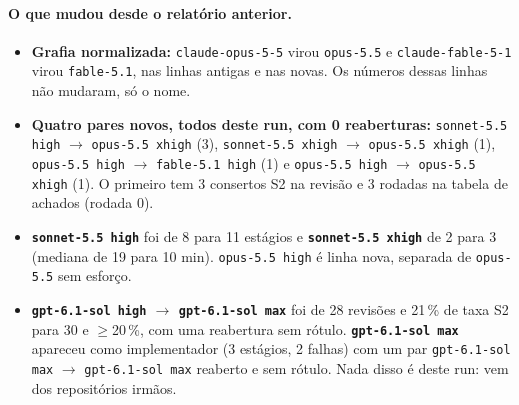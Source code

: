 \documentclass[11pt,a4paper]{article}
\begin{document}
\medskip
{}

\paragraph{O que mudou desde o relatório anterior.}
\begin{itemize}
  \item \textbf{Grafia normalizada:} \texttt{claude-opus-5-5} virou
        \texttt{opus-5.5} e \texttt{claude-fable-5-1} virou
        \texttt{fable-5.1}, nas linhas antigas e nas novas. Os números dessas
        linhas não mudaram, só o nome.
  \item \textbf{Quatro pares novos, todos deste run, com 0 reaberturas:}
        \texttt{sonnet-5.5 high} $\to$ \texttt{opus-5.5 xhigh} (3),
        \texttt{sonnet-5.5 xhigh} $\to$ \texttt{opus-5.5 xhigh} (1),
        \texttt{opus-5.5 high} $\to$ \texttt{fable-5.1 high} (1) e
        \texttt{opus-5.5 high} $\to$ \texttt{opus-5.5 xhigh} (1). O primeiro
        tem 3 consertos S2 na revisão e 3 rodadas na tabela de achados (rodada
        0).
  \item \textbf{\texttt{sonnet-5.5 high}} foi de 8 para 11 estágios e
        \textbf{\texttt{sonnet-5.5 xhigh}} de 2 para 3 (mediana de 19 para
        10 min). \texttt{opus-5.5 high} é linha nova, separada de
        \texttt{opus-5.5} sem esforço.
  \item \textbf{\texttt{gpt-6.1-sol high} $\to$ \texttt{gpt-6.1-sol max}} foi
        de 28 revisões e 21\,\% de taxa S2 para 30 e $\geq$20\,\%, com uma
        reabertura sem rótulo. \textbf{\texttt{gpt-6.1-sol max}} apareceu como
        implementador (3 estágios, 2 falhas) com um par
        \texttt{gpt-6.1-sol max} $\to$ \texttt{gpt-6.1-sol max} reaberto e sem
        rótulo. Nada disso é deste run: vem dos repositórios irmãos.
\end{itemize}
\end{document}
